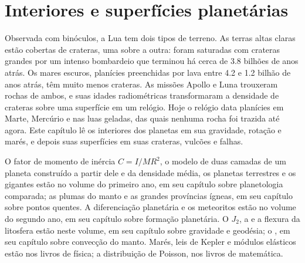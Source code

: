 \chapter{Interiores e superfícies planetárias}\label{ch:b3:planetary-interiors-surfaces}

Observada com binóculos, a Lua tem dois tipos de terreno. As terras altas
claras estão cobertas de crateras, uma sobre a outra: foram saturadas
com crateras grandes por um intenso bombardeio que terminou há cerca de 3.8 bilhões
de anos atrás. Os mares escuros, planícies preenchidas por lava entre 4.2 e 1.2
bilhão de anos atrás, têm muito menos crateras. As missões Apollo e Luna
trouxeram rochas de ambos, e suas idades radiométricas transformaram a
densidade de crateras sobre uma superfície em um relógio. Hoje o relógio data
planícies em Marte, Mercúrio e nas luas geladas, das quais nenhuma rocha foi
trazida até agora. Este capítulo lê os interiores dos planetas em sua
gravidade, rotação e marés, e depois suas superfícies em suas crateras,
vulcões e falhas.

\begin{recall}
O fator de momento de inércia $C = I/MR^2$, o modelo de duas camadas de um planeta
construído a partir dele e da densidade média, os planetas terrestres e os
gigantes estão no volume do primeiro ano, em seu capítulo sobre
planetologia comparada; as plumas do manto e as grandes províncias ígneas, em seu capítulo sobre
pontos quentes. A diferenciação planetária e os meteoritos estão no volume do segundo
ano, em seu capítulo sobre formação planetária. O 
$J_2$, a  e a flexura da litosfera estão neste
volume, em seu capítulo sobre gravidade e geodésia; o , em seu
capítulo sobre convecção do manto. Marés, leis de Kepler e módulos elásticos
estão nos livros de física; a distribuição de Poisson, nos livros de
matemática.
\end{recall}

